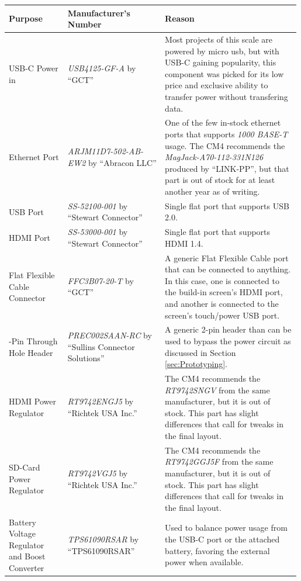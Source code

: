 \renewcommand*{\arraystretch}{1.5} %
\begin{longtable}{|>{\raggedright\arraybackslash}p{0.2\linewidth}|>{\raggedright\arraybackslash}p{0.33\linewidth}|>{\raggedright\arraybackslash}p{0.46\linewidth}|}
  \hline
  \bfseries Purpose & \bfseries Manufacturer's Number &\bfseries Reason \\%
  \hline
  USB-C Power in & \emph{USB4125-GF-A} by \enquote{GCT} & Most projects of this scale are powered by micro usb, but with USB-C gaining popularity, this component was picked for its low price and exclusive ability to transfer power without transfering data. \\
  \hline
  Ethernet Port & \emph{ARJM11D7-502-AB-EW2} by \enquote{Abracon LLC} & One of the few in-stock ethernet ports that supports \emph{1000 BASE-T} usage. The CM4 recommends the \emph{MagJack-A70-112-331N126} produced by \enquote{LINK-PP}, but that part is out of stock for at least another year as of writing. \\
  \hline
  USB Port & \emph{SS-52100-001} by \enquote{Stewart Connector} & Single flat port that supports USB 2.0. \\
  \hline
  HDMI Port & \emph{SS-53000-001} by \enquote{Stewart Connector} & Single flat port that supports HDMI 1.4. \\
  \hline
  Flat Flexible Cable Connector & \emph{FFC3B07-20-T} by \enquote{GCT} & A generic Flat Flexible Cable port that can be connected to anything. In this case, one is connected to the build-in screen's HDMI port, and another is connected to the screen's touch/power USB port. \\
  \hline
  2-Pin Through Hole Header & \emph{PREC002SAAN-RC} by \enquote{Sullins Connector Solutions} & A generic 2-pin header than can be used to bypass the power circuit as discussed in Section \ref{sec:Prototyping}. \\
  \hline
  HDMI Power Regulator & \emph{RT9742ENGJ5} by \enquote{Richtek USA Inc.} & The CM4 recommends the \emph{RT9742SNGV} from the same manufacturer, but it is out of stock. This part has slight differences that call for tweaks in the final layout. \\
  \hline
  SD-Card Power Regulator & \emph{RT9742VGJ5} by \enquote{Richtek USA Inc.} & The CM4 recommends the \emph{RT9742GGJ5F} from the same manufacturer, but it is out of stock. This part has slight differences that call for tweaks in the final layout. \\
  \hline
  Battery Voltage Regulator and Boost Converter & \emph{TPS61090RSAR} by \enquote{TPS61090RSAR} & Used to balance power usage from the USB-C port or the attached battery, favoring the external power when available. \\

\end{longtable}
